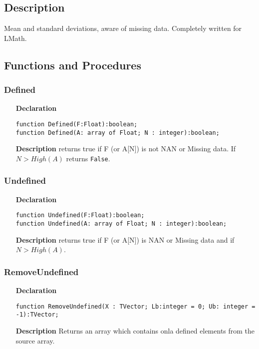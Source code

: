 \documentclass[12pt,a4paper,oneside]{report}
\newcommand{\declarationitem}[1]{\textbf{#1}}
\newcommand{\descriptiontitle}[1]{\textbf{#1}}
\newcommand{\code}[1]{\texttt{#1}}
\begin{document}
\subsection{Description}
Mean and standard deviations, aware of missing data. Completely written for LMath.
\subsection{Functions and Procedures}
\subsubsection{Defined}
\label{umeansd_md-defined}
\begin{itemize}\item[\declarationitem{Declaration}\hfill]
	\begin{flushleft}
		\code{function Defined(F:Float):boolean;}\\
		\code{function Defined(A: array of Float; N : integer):boolean;}
	\end{flushleft}
	\item[\descriptiontitle{Description}]
	returns true if F (or A[N]) is not NAN or Missing data. If $N>High(A)$ returns \code{False}.
\end{itemize}
\subsubsection{Undefined}
\label{umeansd_md-Undefined}
\begin{itemize}\item[\declarationitem{Declaration}\hfill]
	\begin{flushleft}
		\code{function Undefined(F:Float):boolean;}\\
		\code{function Undefined(A: array of Float; N : integer):boolean;}
	\end{flushleft}
	\item[\descriptiontitle{Description}]
	returns true if F (or A[N]) is NAN or Missing data and if $N > High(A)$.
\end{itemize}
\subsubsection{RemoveUndefined}
\label{umeansd_md-RemoveUndefined}
\begin{itemize}\item[\declarationitem{Declaration}\hfill]
	\begin{flushleft}
		\code{function RemoveUndefined(X : TVector; Lb:integer = 0; Ub: integer = -1):TVector;}
	\end{flushleft}
	\item[\descriptiontitle{Description}]
	Returns an array which contains onla defined elements from the source array.
\end{itemize}
\end{document}
